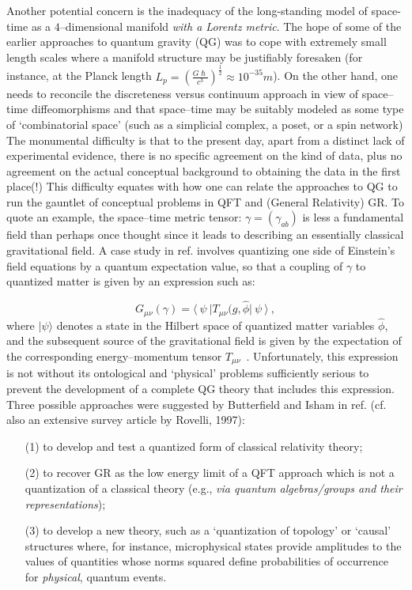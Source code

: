 \documentclass[12pt]{article}
\theoremstyle{plain}
\theoremstyle{definition}
\numberwithin{equation}{section}
\begin{document}
    Another potential concern is the inadequacy of the long-standing model of 
space-time as a $4$--dimensional manifold \emph{with a Lorentz metric}. The hope of some of 
the earlier approaches to quantum gravity (QG) was to cope with extremely small length scales 
where a manifold structure may be justifiably foresaken (for instance, at the Planck length 
$L_p = (\frac{G\hslash}{c^3})^{\frac{1}{2}} \approx 10^{-35}m$). On the other hand, one needs to 
reconcile the discreteness versus continuum approach in view of 
space--time diffeomorphisms and that space--time may be suitably modeled as some type of 
`combinatorial space' (such as a simplicial complex, a poset, or a spin network) The 
monumental difficulty is that to the present day, apart from a distinct lack of experimental 
evidence, there is no specific agreement on the kind of data, plus no agreement on the actual 
conceptual background to obtaining the data in the first place(!) This difficulty equates with 
how one can relate the approaches to QG to run the gauntlet of conceptual problems in QFT and 
(General Relativity) GR. To quote an example, the space--time metric tensor:
$\gamma = (\gamma_{ab})$ is less a fundamental field than perhaps once thought since it leads 
to describing an essentially classical gravitational field. A case study in ref. \cite 
{BIsham1} involves quantizing one side of Einstein's field equations by a quantum expectation value, so that a coupling of $\gamma$ to quantized matter is given by an expression such as:

$$ G_{\mu \nu} (\gamma) = \langle~ \psi ~\vert T_{\mu \nu} (g, \hat{\phi} \vert~ \psi 
~\rangle~, $$
\bigbreak
where $ \vert \psi \rangle$ denotes a state in the Hilbert space of quantized matter variables $\hat{\phi}$, and the subsequent source of the gravitational field is given by the expectation %
of the corresponding energy--momentum tensor $T_{\mu \nu}$~. Unfortunately, this expression is 
not without its ontological and `physical' problems sufficiently serious to prevent the 
development of a complete QG theory that includes this expression. Three possible approaches 
were suggested by Butterfield and Isham in ref. \cite {BIsham1} (cf. also an extensive survey 
article by Rovelli, 1997):



\begin{itemize}
\item[(1)] to develop and test a quantized form of classical relativity theory;
\item[(2)]to recover GR as the low energy limit of a QFT approach which is not a quantization 
of a classical theory (e.g., \emph{via quantum algebras/groups and their representations});
\item[(3)]to develop a new theory, such as a `quantization of topology' or 
`causal' structures where, for instance, microphysical states provide amplitudes to the values 
of quantities whose norms squared define probabilities of occurrence for \emph{physical}, 
quantum events.
\end{itemize}
\end{document}
